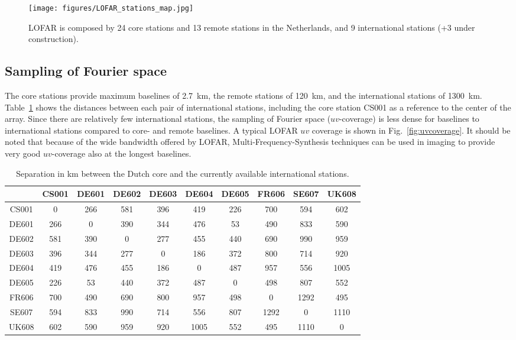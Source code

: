 \documentclass[graybox]{svmult}
\begin{document}
\begin{figure}[t]
\begin{center}
\texttt{[image: figures/LOFAR\_stations\_map.jpg]}
\caption{LOFAR is composed by 24 core stations and 13 remote stations in the
Netherlands, and 9 international stations (+3 under construction).}
\label{fig:stations}
\end{center}
\end{figure}


\subsection{Sampling of Fourier space}\label{sec:uvcoverage}
The core stations provide maximum baselines of 2.7~km, the remote stations of
120~km, and the international stations of 1300~km.  Table~\ref{tab:baselines}
shows the distances between each pair of international stations, including the
core station CS001 as a reference to the center of the array.  Since there are
relatively few international stations, the sampling of Fourier space
($uv$-coverage) is less dense for baselines to international stations compared
to core- and remote baselines.  A typical LOFAR $uv$ coverage is shown in
Fig.~\ref{fig:uvcoverage}.  It should be noted that because of the wide
bandwidth offered by LOFAR, Multi-Frequency-Synthesis techniques can be used in
imaging to provide very good $uv$-coverage also at the longest baselines.  

\begin{table}[h]
\centering
\begin{tabular}{cccccccccc}
\hline
\hline
      & CS001& DE601& DE602& DE603& DE604& DE605& FR606& SE607& UK608\\
\hline
 CS001&     0&   266&   581&   396&   419&   226&   700&   594&   602 \\
 DE601&   266&     0&   390&   344&   476&    53&   490&   833&   590 \\
 DE602&   581&   390&     0&   277&   455&   440&   690&   990&   959 \\
 DE603&   396&   344&   277&     0&   186&   372&   800&   714&   920 \\
 DE604&   419&   476&   455&   186&     0&   487&   957&   556&  1005 \\
 DE605&   226&    53&   440&   372&   487&     0&   498&   807&   552 \\
 FR606&   700&   490&   690&   800&   957&   498&     0&  1292&   495 \\
 SE607&   594&   833&   990&   714&   556&   807&  1292&     0&  1110 \\
 UK608&   602&   590&   959&   920&  1005&   552&   495&  1110&     0 \\
\hline
\end{tabular}
\caption{Separation in km between the Dutch core and the currently available
international stations.
\label{tab:baselines}}
\end{table}
\end{document}
